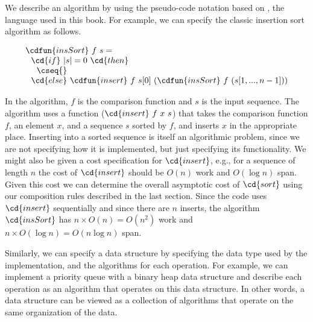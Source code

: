 \begin{gram}
We describe an algorithm by using the pseudo-code notation based on
\pml, the language  used in this book.  For example, we can specify
the classic insertion sort algorithm as follows.
%

\[
\begin{array}{l}
\cdfun{insSort}~f~s =
\\ 
~~\cd{if}~|s| = 0~\cd{then} 
\\
~~~~\cseq{}
\\
~~\cd{else}~\cdfun{insert}~f~s[0]~(\cdfun{insSort}~f~(s[1,...,n-1]))
\end{array}
\]


In the algorithm, $f$ is the comparison function and $s$ is the input
sequence. %
The algorithm uses a function ($\cd{insert}~f~x~s$) that
takes the comparison function $f$, an element $x$, and a sequence $s$
sorted by $f$, and inserts $x$ in the appropriate place.  
%
Inserting into a sorted sequence is itself an algorithmic problem,
since we are not specifying how it is implemented, but just specifying
its functionality.  
%
We might also be given a cost specification for $\cd{insert}$, e.g., for
a sequence of length $n$ the cost of $\cd{insert}$ should be $O(n)$
work and $O(\log n)$ span.  
%
Given this cost we can determine the overall asymptotic cost of
$\cd{sort}$ using our composition rules described in the last section.
%
Since the code uses $\cd{insert}$ sequentially and since there are $n$
inserts, the algorithm $\cd{insSort}$ has $n \times O(n) =
O(n^2)$ work and $n \times O(\log n) = O(n \log n)$ span.
\end{gram}

\begin{gram}
Similarly, we can specify a data structure by specifying the data type
used by the implementation, and the algorithms for each operation.
%
For example, we can implement a priority queue with a binary heap data
structure and describe each operation as an algorithm that operates on
this data structure.  In other words, a data structure can be viewed
as a collection of algorithms that operate on the same organization
of the data.
\end{gram}


